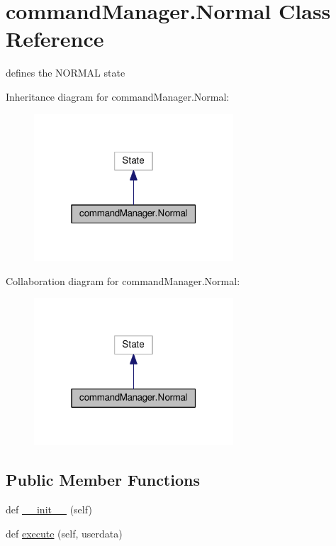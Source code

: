 \hypertarget{classcommandManager_1_1Normal}{}\section{command\+Manager.\+Normal Class Reference}
\label{classcommandManager_1_1Normal}


defines the N\+O\+R\+M\+AL state  




Inheritance diagram for command\+Manager.\+Normal\+:
\nopagebreak
\begin{figure}[H]
\begin{center}
\leavevmode
\includegraphics[width=211pt]{classcommandManager_1_1Normal__inherit__graph}
\end{center}
\end{figure}


Collaboration diagram for command\+Manager.\+Normal\+:
\nopagebreak
\begin{figure}[H]
\begin{center}
\leavevmode
\includegraphics[width=211pt]{classcommandManager_1_1Normal__coll__graph}
\end{center}
\end{figure}
\subsection*{Public Member Functions}
\begin{DoxyCompactItemize}
\item 
def \hyperlink{classcommandManager_1_1Normal_abda69ab53b7d84c2c0c577dcf26f3823}{\+\_\+\+\_\+init\+\_\+\+\_\+} (self)
\item 
def \hyperlink{classcommandManager_1_1Normal_ae95451bab37e817557988c7190bb33bd}{execute} (self, userdata)
\end{DoxyCompactItemize}
